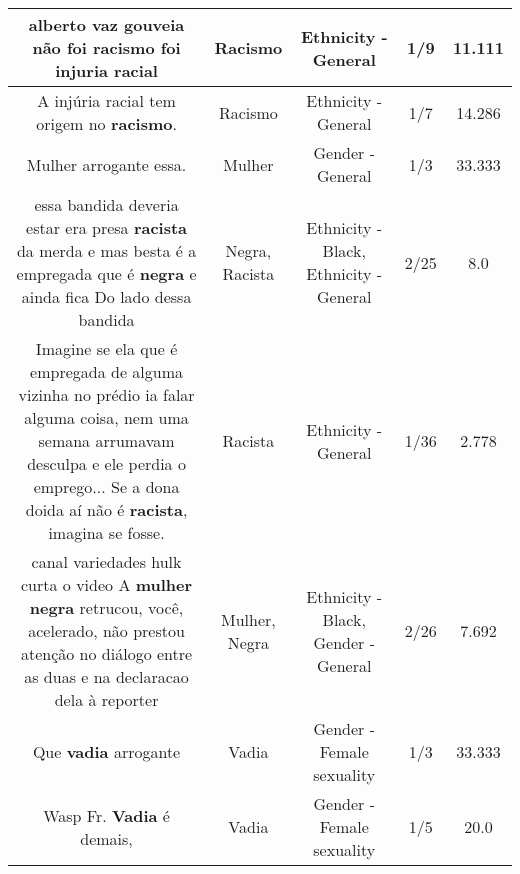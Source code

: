 \documentclass[11pt]{article}
\newlength\mylength
\begin{document}
\begin{center}
\begin{longtable}{|C{.65\mylength}|C{.30\mylength}|C{.12\mylength}|C{.12\mylength}|C{.12\mylength}|}
  \small alberto vaz gouveia não foi \textbf{racismo} foi injuria racial\normalsize   & Racismo & Ethnicity - General & 1/9 & 11.111 \\  \hline
  \small A injúria racial tem origem no \textbf{racismo}.\normalsize   & Racismo & Ethnicity - General & 1/7 & 14.286 \\  \hline
  \small Mulher arrogante essa.\normalsize   & Mulher & Gender - General & 1/3 & 33.333 \\  \hline
  \small essa bandida deveria estar era presa \textbf{racista} da merda e mas besta é a empregada que é \textbf{negra} e ainda fica Do lado dessa bandida\normalsize   & Negra, Racista & Ethnicity - Black, Ethnicity - General & 2/25 & 8.0 \\  \hline
  \small Imagine se ela que é empregada de alguma vizinha no prédio ia falar alguma coisa, nem uma semana arrumavam desculpa e ele perdia o emprego... Se a dona doida aí não é \textbf{racista}, imagina se fosse.\normalsize   & Racista & Ethnicity - General & 1/36 & 2.778 \\  \hline
  \small canal variedades hulk curta o video A \textbf{mulher} \textbf{negra} retrucou, você, acelerado, não prestou atenção no diálogo entre as duas e na declaracao dela à reporter\normalsize   & Mulher, Negra & Ethnicity - Black, Gender - General & 2/26 & 7.692 \\  \hline
  \small Que \textbf{vadia} arrogante\normalsize   & Vadia & Gender - Female sexuality & 1/3 & 33.333 \\  \hline
  \small Wasp Fr. \textbf{Vadia} é demais,\normalsize   & Vadia & Gender - Female sexuality & 1/5 & 20.0 \\  \hline

\end{longtable}
\end{center}
\end{document}
